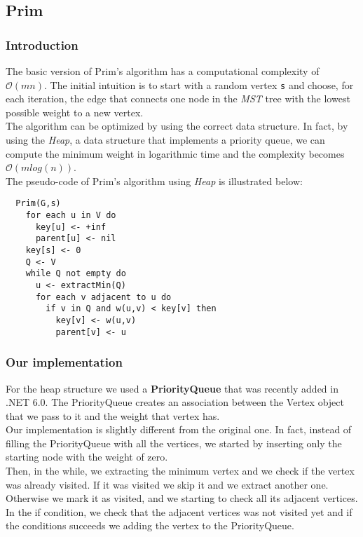 \subsection{Prim}
\subsubsection{Introduction}
The basic version of Prim's algorithm has a computational complexity of $\mathcal{O}(mn)$.
The initial intuition is to start with a random vertex \verb|s| and choose, for each iteration, the edge 
that connects one node in the \textit{MST} tree with the lowest possible weight to a new vertex.\\
The algorithm can be optimized by using the correct data structure.
In fact, by using the \textit{Heap}, a data structure that implements a priority queue, we can compute the 
minimum weight in logarithmic time and the complexity becomes $\mathcal{O}(mlog(n))$. \\

\noindent
The pseudo-code of Prim's algorithm using \textit{Heap} is illustrated below:
\begin{verbatim}
  Prim(G,s)
    for each u in V do
      key[u] <- +inf
      parent[u] <- nil
    key[s] <- 0
    Q <- V
    while Q not empty do
      u <- extractMin(Q)
      for each v adjacent to u do
        if v in Q and w(u,v) < key[v] then
          key[v] <- w(u,v)
          parent[v] <- u
\end{verbatim}

\subsubsection{Our implementation}
For the heap structure we used a \textbf{PriorityQueue} that was recently added in .NET 6.0.
The PriorityQueue creates an association between the Vertex object that we pass to it and the weight that vertex has.\\
Our implementation is slightly different from the original one. In fact, instead of filling the PriorityQueue with 
all the vertices, we started by inserting only the starting node with the weight of zero.\\
Then, in the while, we extracting the minimum vertex and we check if the vertex was already visited.
If it was visited we skip it and we extract another one.
Otherwise we mark it as visited, and we starting to check all its adjacent vertices.
In the if condition, we check that the adjacent vertices was not visited yet and if the conditions succeeds 
we adding the vertex to the PriorityQueue.

